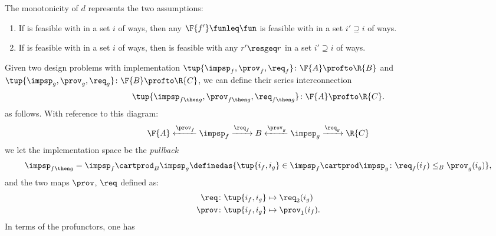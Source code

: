 {	\noindent The monotonicity of $d$ represents the two assumptions:
	\begin{enumerate}
		\item If \fun is feasible with \res in a set $i$ of ways, then any $\F{f'}\funleq \fun$ is feasible with \res in a set $i'\supseteq i$ of ways.
		\item If \fun is feasible with \res in a set $i$ of ways, then \fun is feasible with any $r'\resgeq r$ in a set $i'\supseteq i$ of ways.
	\end{enumerate}

	\begin{definition}
		\label{def:seriesdpi}
		Given two design problems with implementation $\tup{\impsp_f,\prov_f,\req_f}\colon \F{A}\profto \R{B}$ and $\tup{\impsp_g,\prov_g,\req_g}\colon \F{B}\profto \R{C}$, we can define their series interconnection
		\begin{equation*}
			\tup{\impsp_{f\then g},\prov_{f\then g},\req_{f\then g}}\colon \F{A}\profto \R{C}.
		\end{equation*}
		as follows.
		With reference to this diagram:
		\begin{equation}
			\F{A} \xleftarrow{\prov_f} \impsp_f \xrightarrow{\req_f} B
			\xleftarrow{\prov_g} \impsp_g \xrightarrow{\req_g} \R{C}
		\end{equation}
		we let the implementation space be the \emph{pullback}
		\begin{equation}
			\begin{aligned}
				\impsp_{f\then g} & = \impsp_f \cartprod_B \impsp_g \definedas \{
				\tup{i_f,i_g} \in \impsp_f \cartprod \impsp_g \colon
				\req_f(i_f) \leq_{B} \prov_g(i_g)
				\},                                                               \\
			\end{aligned}
		\end{equation}
		and the two maps $\prov$, $\req$ defined as:
		\begin{equation}
			\begin{aligned}
				\req  & \colon \tup{i_f,i_g} \mapsto \req_2(i_g)    \\
				\prov & \colon  \tup{i_f,i_g} \mapsto \prov_1(i_f).
			\end{aligned}
		\end{equation}
		In terms of the profunctors, one has
		\begin{widepar}
			\begin{equation}
				\label{eq:seriesdpi}

\end{equation}
\end{widepar}
\end{definition}}
